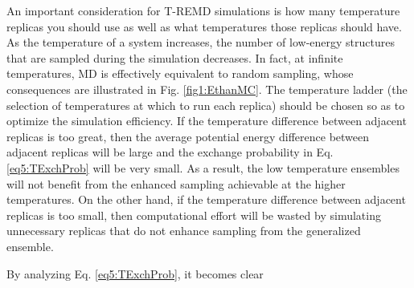 An important consideration for T-REMD simulations is how many temperature
replicas you should use as well as what temperatures those replicas should have.
As the temperature of a system increases, the number of low-energy structures
that are sampled during the simulation decreases. In fact, at infinite
temperatures, MD is effectively equivalent to random sampling, whose
consequences are illustrated in Fig. \ref{fig1:EthanMC}. The temperature ladder
(\ie the selection of temperatures at which to run each replica) should be
chosen so as to optimize the simulation efficiency. If the temperature
difference between adjacent replicas is too great, then the average potential
energy difference between adjacent replicas will be large and the exchange
probability in Eq. \ref{eq5:TExchProb} will be very small. As a result, the low
temperature ensembles will not benefit from the enhanced sampling achievable at
the higher temperatures. On the other hand, if the temperature difference
between adjacent replicas is too small, then computational effort will be wasted
by simulating unnecessary replicas that do not enhance sampling from the
generalized ensemble.

By analyzing Eq. \ref{eq5:TExchProb}, it becomes clear 
